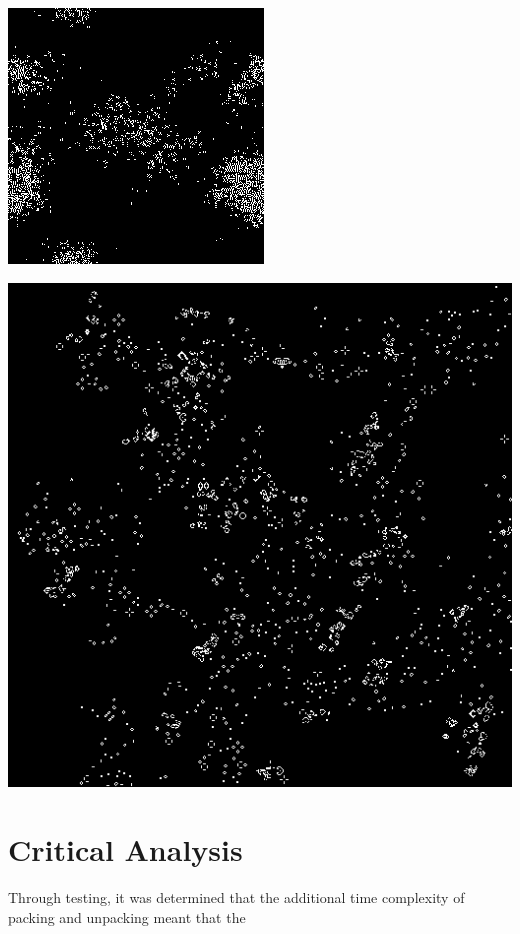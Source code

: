 \documentclass[11pt, oneside]{article}
\newenvironment{Figure}
  {\par\medskip\noindent\minipage{\linewidth}}
  {\endminipage\par\medskip}
\begin{document}
\begin{multicols}{3}
\begin{Figure}
\includegraphics[width=\linewidth]{images/256x256_2.png}
\end{Figure}


\begin{Figure}
\includegraphics[width=\linewidth]{images/512x512_2.png}
\end{Figure}

\end{multicols}

\pagebreak
\section{Critical Analysis}
Through testing, it was determined that the additional time complexity of packing and unpacking meant that the





\end{document}
